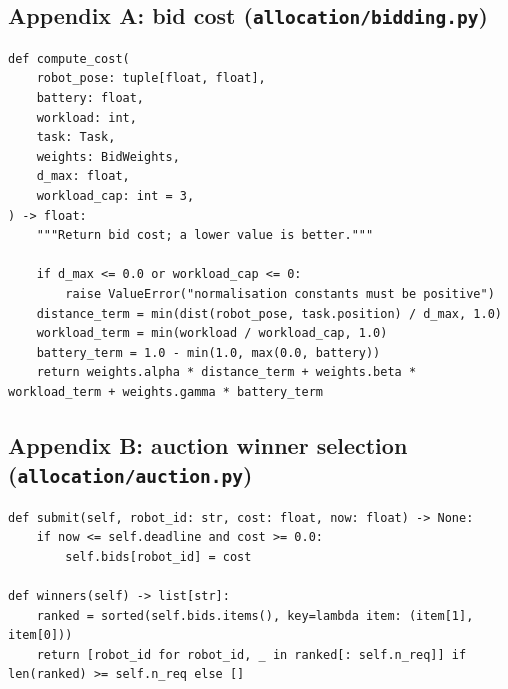 \documentclass[conference]{IEEEtran}
\begin{document}
\subsection*{Appendix A: bid cost (\texttt{allocation/bidding.py})}
\begin{lstlisting}[style=py,firstnumber=24]
def compute_cost(
    robot_pose: tuple[float, float],
    battery: float,
    workload: int,
    task: Task,
    weights: BidWeights,
    d_max: float,
    workload_cap: int = 3,
) -> float:
    """Return bid cost; a lower value is better."""

    if d_max <= 0.0 or workload_cap <= 0:
        raise ValueError("normalisation constants must be positive")
    distance_term = min(dist(robot_pose, task.position) / d_max, 1.0)
    workload_term = min(workload / workload_cap, 1.0)
    battery_term = 1.0 - min(1.0, max(0.0, battery))
    return weights.alpha * distance_term + weights.beta * workload_term + weights.gamma * battery_term
\end{lstlisting}

\subsection*{Appendix B: auction winner selection (\texttt{allocation/auction.py})}
\begin{lstlisting}[style=py,firstnumber=16]
def submit(self, robot_id: str, cost: float, now: float) -> None:
    if now <= self.deadline and cost >= 0.0:
        self.bids[robot_id] = cost

def winners(self) -> list[str]:
    ranked = sorted(self.bids.items(), key=lambda item: (item[1], item[0]))
    return [robot_id for robot_id, _ in ranked[: self.n_req]] if len(ranked) >= self.n_req else []
\end{lstlisting}
\end{document}
